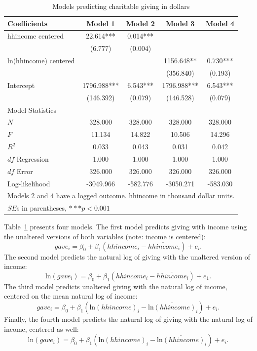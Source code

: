 \begin{table}[htbp]\centering
\caption{ Models predicting charitable giving in dollars
\label{tab:charity}}
\begin{tabular}{lcccc}
\hline
Coefficients&Model 1&Model 2&Model 3&Model 4 \\ \hline
hhincome centered  &   22.614*** &    0.014*** &        &        \\
      &   (6.777)  &   (0.004)  &        &        \\
ln(hhincome) centered &        &        &  1156.648** &    0.730*** \\
      &        &        &  (356.840)  &   (0.193)  \\
Intercept    &  1796.988*** &    6.543*** &  1796.988*** &    6.543*** \\
      &  (146.392)  &   (0.079)  &  (146.528)  &   (0.079)  \\
\hline
\multicolumn{5}{l}{Model Statistics} \\
\hline
$N$ &   328.000  &   328.000  &   328.000  &   328.000  \\
$F$ 	 &   11.134  &   14.822  &   10.506  &   14.296  \\
$R^2$  &    0.033  &    0.043  &    0.031  &    0.042  \\
$df$ Regression &    1.000  &    1.000  &    1.000  &    1.000  \\
$df$ Error 		 &   326.000  &   326.000  &   326.000  &   326.000  \\
Log-likelihood &  -3049.966  &  -582.776  &  -3050.271  &  -583.030  \\
\hline
\multicolumn{5}{l}{Models 2 and 4 have a logged outcome. hhincome in thousand dollar units.} \\
\multicolumn{5}{l}{$SE$s in parentheses, $***p<0.001$} \\
\hline
\end{tabular}
\end{table}
Table~\ref{tab:charity} presents four models. The first model predicts giving with income using the unaltered versions of both variables (note: income is centered):
\[
gave_i=\beta_0+\beta_1\left(hhincome_i-\overline{hhincome}_i\right) + e_i.
\]
The second model predicts the natural log of giving with the unaltered version of income:
\[
\mbox{ln}\left(gave_i\right)=\beta_0+\beta_1\left(hhincome_i-\overline{hhincome}_i\right)+e_1.
\]
The third model predicts unaltered giving with the natural log of income, centered on the mean natural log of income:
\[
gave_i=\beta_0+\beta_1\left(\mbox{ln}\left(hhincome\right)_i-\overline{\mbox{ln}\left(hhincome\right)}_i\right) + e_i.
\]
Finally, the fourth model predicts the natural log of giving with the natural log of income, centered as well:
\[
\mbox{ln}\left(gave_i\right)=\beta_0+\beta_1\left(\mbox{ln}\left(hhincome\right)_i-\overline{\mbox{ln}\left(hhincome\right)}_i\right)+e_i.
\]
